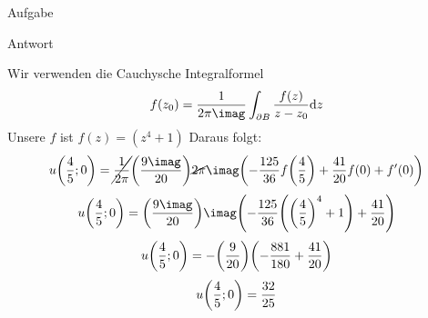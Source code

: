 \documentclass{scrartcl}
\begin{document}
\begin{section}{Aufgabe}
\begin{subsection}{Antwort}
\begin{itemize}
Wir verwenden die Cauchysche Integralformel
\[f(z_0)=\frac{1}{2\pi \imag} \int_{\partial B}\frac{f(z)}{z-z_0}\dd z\]
Unsere $f$ ist $f(z)=(z^4+1)$
Daraus folgt:
 \[u\qty(\frac{4}{5};0)=\cancel{\frac{1}{2\pi}} \qty(\frac{9 \imag}{20}) \cancel{2\pi} \imag \qty(-\frac{125}{36}f\qty(\frac{4}{5})+\frac{41}{20}f(0)+f'(0)) \]
 \[u\qty(\frac{4}{5};0)= \qty(\frac{9 \imag}{20}) \imag \qty(-\frac{125}{36}\qty(\qty(\frac{4}{5})^4+1)+\frac{41}{20}) \]
 \[u\qty(\frac{4}{5};0)=- \qty(\frac{9}{20})  \qty(-\frac{881}{180}+\frac{41}{20}) \]
 \[u\qty(\frac{4}{5};0)=\frac{32}{25} \]

\end{itemize}
    \end{subsection}  
\end{section}
\end{document}
